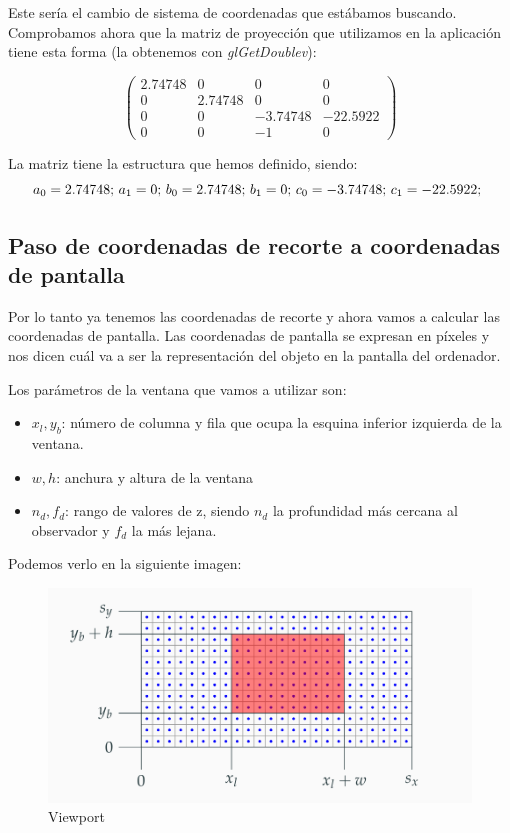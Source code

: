 \documentclass[a4paper,11pt, oneside]{book}
\begin{document}
Este sería el cambio de sistema de coordenadas que estábamos buscando. Comprobamos ahora que la matriz de proyección que utilizamos en la aplicación tiene esta forma (la obtenemos con \textit{glGetDoublev}):

$$\begin{pmatrix}
2.74748 & 0&0&0\\
0&2.74748 &0&0\\
0&0&-3.74748&-22.5922\\
0&0&-1&0
\end{pmatrix}$$

La matriz tiene la estructura que hemos definido, siendo:
$$a_0 = 2.74748\textup{;  }
a_1 = 0\textup{;  }
b_0 = 2.74748\textup{;  }
b_1 = 0\textup{;  }
c_0 = -3.74748\textup{;  }
c_1 = -22.5922\textup{;  }
$$

\subsection{Paso de coordenadas de recorte a coordenadas de pantalla}
Por lo tanto ya tenemos las coordenadas de recorte y ahora vamos a calcular las coordenadas de pantalla. Las coordenadas de pantalla se expresan en píxeles y nos dicen cuál va a ser la representación del objeto en la pantalla del ordenador.

Los parámetros de la ventana que vamos a utilizar son:
\begin{itemize}
	\item $x_l, y_b$: número de columna y fila que ocupa la esquina inferior izquierda de la ventana.
	\item $w,h$: anchura y altura de la ventana
	\item $n_d, f_d$: rango de valores de z, siendo $n_d$ la profundidad más cercana al observador y $f_d$ la más lejana.
\end{itemize}
Podemos verlo en la siguiente imagen:
\begin{figure}[H]
	
	\centering
	\includegraphics[width=\linewidth]{viewport}
	\caption{Viewport}
	\label{fig:figura1}
	
\end{figure}
\end{document}
